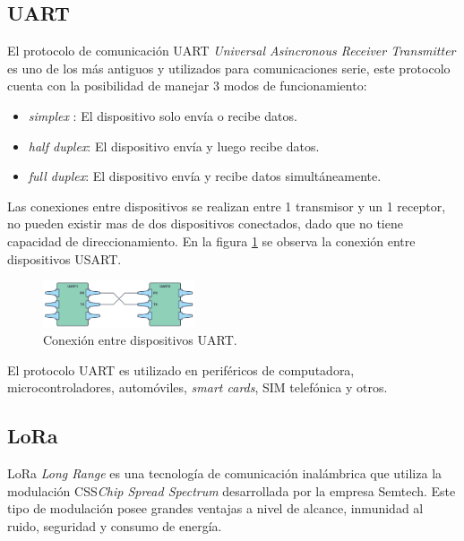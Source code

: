 \subsection{UART}

El protocolo de comunicación UART \textit{Universal Asincronous Receiver Transmitter} es uno de los más antiguos y utilizados para comunicaciones serie, este protocolo cuenta con la posibilidad de manejar 3 modos de funcionamiento:
\begin{itemize}
	\item \textit{simplex} :	El dispositivo solo envía o recibe datos.
	\item \textit{half duplex}:  El dispositivo envía y luego recibe datos.
	\item \textit{full duplex}:  El dispositivo envía y recibe datos simultáneamente.
\end{itemize}
Las conexiones entre dispositivos se realizan entre 1 transmisor y un 1 receptor, no pueden existir mas de dos dispositivos conectados, dado que no tiene capacidad de direccionamiento. En la figura \ref{fig:UART} se observa la conexión entre dispositivos USART.


\begin{figure}[htbp]
	\centering
	\includegraphics[width=0.4\textwidth]{./Figures/UART.png}
	\caption{Conexión entre dispositivos UART\citep{ARTICLE5}.}
	\label{fig:UART}
\end{figure} 
El protocolo UART es utilizado en periféricos de computadora, microcontroladores, automóviles, \textit{smart cards}, SIM telefónica y otros. 


\subsection{LoRa}

LoRa \textit{Long Range} es una tecnología de comunicación inalámbrica que utiliza la modulación CSS\textit{Chip Spread Spectrum} desarrollada por la empresa Semtech. 
Este tipo de modulación posee grandes ventajas a nivel de alcance, inmunidad al ruido, seguridad y consumo de energía\citep{ARTICLE6}.

